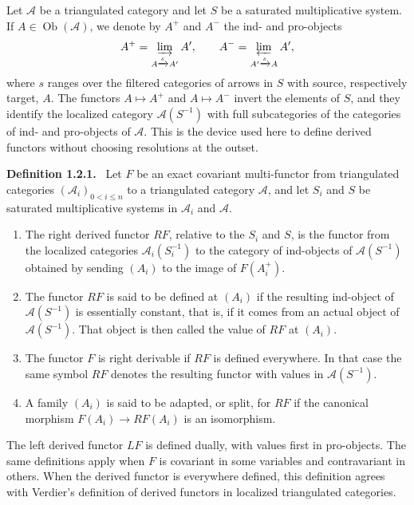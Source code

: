 \documentclass[12pt]{article}
\newcommand{\A}{\mathcal{A}}
\newcommand{\Ob}{\operatorname{Ob}}
\newenvironment{statement}[1]{\par\medskip\noindent\textbf{#1.}\ }{\par\medskip}
\begin{document}
Let \(\A\) be a triangulated category and let \(S\) be a saturated multiplicative system. If \(A\in\Ob(\A)\), we denote by \(A^+\) and \(A^-\) the ind- and pro-objects
\[
 A^+=\varinjlim_{A\xrightarrow{s}A'} A',
 \qquad
 A^-=\varprojlim_{A'\xrightarrow{s}A}A',
\]
where \(s\) ranges over the filtered categories of arrows in \(S\) with source, respectively target, \(A\). The functors \(A\mapsto A^+\) and \(A\mapsto A^-\) invert the elements of \(S\), and they identify the localized category \(\A(S^{-1})\) with full subcategories of the categories of ind- and pro-objects of \(\A\). This is the device used here to define derived functors without choosing resolutions at the outset.

\begin{statement}{Definition 1.2.1}
Let \(F\) be an exact covariant multi-functor from triangulated categories \((\A_i)_{0<i\le n}\) to a triangulated category \(\A\), and let \(S_i\) and \(S\) be saturated multiplicative systems in \(\A_i\) and \(\A\).
\begin{enumerate}[label=(\roman*)]
\item The right derived functor \(RF\), relative to the \(S_i\) and \(S\), is the functor from the localized categories \(\A_i(S_i^{-1})\) to the category of ind-objects of \(\A(S^{-1})\) obtained by sending \((A_i)\) to the image of \(F(A_i^+)\).
\item The functor \(RF\) is said to be defined at \((A_i)\) if the resulting ind-object of \(\A(S^{-1})\) is essentially constant, that is, if it comes from an actual object of \(\A(S^{-1})\). That object is then called the value of \(RF\) at \((A_i)\).
\item The functor \(F\) is right derivable if \(RF\) is defined everywhere. In that case the same symbol \(RF\) denotes the resulting functor with values in \(\A(S^{-1})\).
\item A family \((A_i)\) is said to be adapted, or split, for \(RF\) if the canonical morphism \(F(A_i)\to RF(A_i)\) is an isomorphism.
\end{enumerate}
\end{statement}

The left derived functor \(LF\) is defined dually, with values first in pro-objects. The same definitions apply when \(F\) is covariant in some variables and contravariant in others. When the derived functor is everywhere defined, this definition agrees with Verdier's definition of derived functors in localized triangulated categories.
\end{document}
